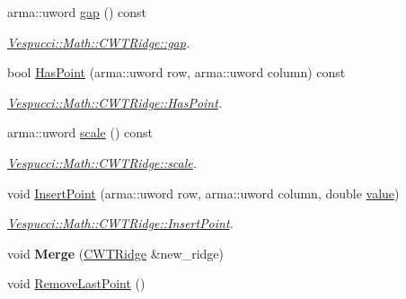 \begin{DoxyCompactItemize}
\item 
arma\+::uword \hyperlink{class_vespucci_1_1_math_1_1_c_w_t_ridge_a83f1ff9fd6e95fb8208055c27e10f1fb}{gap} () const 
\begin{DoxyCompactList}\small\item\em \hyperlink{class_vespucci_1_1_math_1_1_c_w_t_ridge_a83f1ff9fd6e95fb8208055c27e10f1fb}{Vespucci\+::\+Math\+::\+C\+W\+T\+Ridge\+::gap}. \end{DoxyCompactList}\item 
bool \hyperlink{class_vespucci_1_1_math_1_1_c_w_t_ridge_a9057997bb1df3b32bfc85e75784961f2}{Has\+Point} (arma\+::uword row, arma\+::uword column) const 
\begin{DoxyCompactList}\small\item\em \hyperlink{class_vespucci_1_1_math_1_1_c_w_t_ridge_a9057997bb1df3b32bfc85e75784961f2}{Vespucci\+::\+Math\+::\+C\+W\+T\+Ridge\+::\+Has\+Point}. \end{DoxyCompactList}\item 
arma\+::uword \hyperlink{class_vespucci_1_1_math_1_1_c_w_t_ridge_a79079be89121582e51a8bae224434c7f}{scale} () const 
\begin{DoxyCompactList}\small\item\em \hyperlink{class_vespucci_1_1_math_1_1_c_w_t_ridge_a79079be89121582e51a8bae224434c7f}{Vespucci\+::\+Math\+::\+C\+W\+T\+Ridge\+::scale}. \end{DoxyCompactList}\item 
void \hyperlink{class_vespucci_1_1_math_1_1_c_w_t_ridge_a0cdb8e92d9b1d1fba2aef32ea882813a}{Insert\+Point} (arma\+::uword row, arma\+::uword column, double \hyperlink{class_vespucci_1_1_math_1_1_c_w_t_ridge_a58ed7b3dc07c568c93daeb266f8b7e56}{value})
\begin{DoxyCompactList}\small\item\em \hyperlink{class_vespucci_1_1_math_1_1_c_w_t_ridge_a0cdb8e92d9b1d1fba2aef32ea882813a}{Vespucci\+::\+Math\+::\+C\+W\+T\+Ridge\+::\+Insert\+Point}. \end{DoxyCompactList}\item 
\hypertarget{class_vespucci_1_1_math_1_1_c_w_t_ridge_a3eeb78c61242936900bcf1497a2d4c17}{void {\bfseries Merge} (\hyperlink{class_vespucci_1_1_math_1_1_c_w_t_ridge}{C\+W\+T\+Ridge} \&new\+\_\+ridge)}\label{class_vespucci_1_1_math_1_1_c_w_t_ridge_a3eeb78c61242936900bcf1497a2d4c17}

\item 
\hypertarget{class_vespucci_1_1_math_1_1_c_w_t_ridge_a039fef6b6678664d8bb8c019937bfbf9}{void \hyperlink{class_vespucci_1_1_math_1_1_c_w_t_ridge_a039fef6b6678664d8bb8c019937bfbf9}{Remove\+Last\+Point} ()}\label{class_vespucci_1_1_math_1_1_c_w_t_ridge_a039fef6b6678664d8bb8c019937bfbf9}


\end{DoxyCompactItemize}
